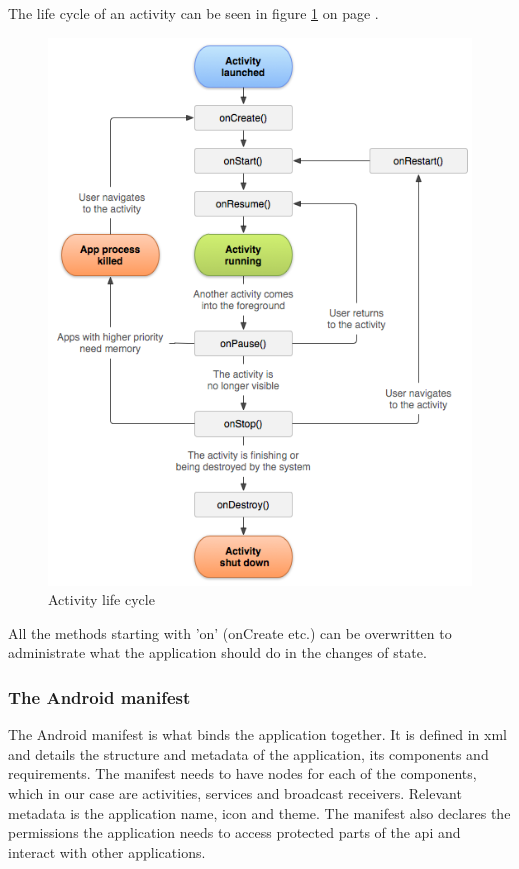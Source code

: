 The life cycle of an activity can be seen in figure \ref{fig:lifecycle} on page \pageref{fig:lifecycle}.
\begin{figure}
	\includegraphics[width=\textwidth]{activity_lifecycle}
	\caption{Activity life cycle \cite{bib:alc}}
	\label{fig:lifecycle}
\end{figure}

All the methods starting with 'on' (onCreate etc.) can be overwritten to administrate what the application should do in the changes of state.

\subsubsection{The Android manifest}
The Android manifest \cite{bib:aman} is what binds the application together. It is defined in \gls{xml} and details the structure and metadata of the application, its components and requirements. The manifest needs to have nodes for each of the components, which in our case are activities, services and broadcast receivers. Relevant metadata is the application name, icon and theme. The manifest also declares the permissions the application needs to access protected parts of the \gls{api} and interact with other applications.



